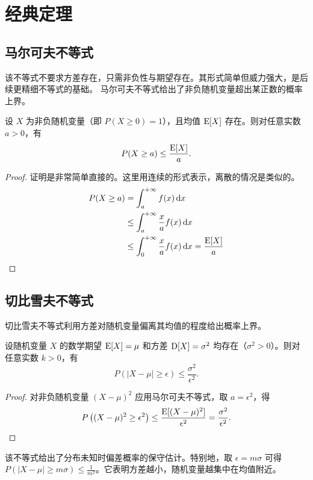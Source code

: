 
\section{经典定理}
\subsection{马尔可夫不等式}

该不等式不要求方差存在，只需非负性与期望存在。其形式简单但威力强大，是后续更精细不等式的基础。
马尔可夫不等式给出了非负随机变量超出某正数的概率上界。

\begin{theorem}[马尔可夫不等式]
设 \(X\) 为非负随机变量（即 \(P(X \ge 0)=1\)），且均值 \(\operatorname{E}[X]\) 存在。则对任意实数 \(a > 0\)，有
\[
P(X \ge a) \le \frac{\operatorname{E}[X]}{a}.
\]
\end{theorem}

\begin{proof}
证明是非常简单直接的。这里用连续的形式表示，离散的情况是类似的。
\begin{align*}
P(X\geq a) &= \int_{a}^{+\infty}f(x)\mathop{}\!\mathrm{d} x\\ 
&\leq \int_{a}^{+\infty}\frac{x}{a}f(x)\mathop{}\!\mathrm{d} x \\
&\leq \int_{0}^{+\infty}\frac{x}{a}f(x)\mathop{}\!\mathrm{d} x = \frac{\operatorname{E}[X]}{a}
\end{align*}
\end{proof}

\subsection{切比雪夫不等式}

切比雪夫不等式利用方差对随机变量偏离其均值的程度给出概率上界。

\begin{theorem}[切比雪夫不等式]
设随机变量 \(X\) 的数学期望 \(\operatorname{E}[X]=\mu\) 和方差 \(\operatorname{D}[X]=\sigma^2\) 均存在（\(\sigma^2>0\)）。则对任意实数 \(k > 0\)，有
\[
P(|X-\mu| \ge \epsilon) \le \frac{\sigma^2}{\epsilon^2}.
\]
\end{theorem}

\begin{proof}
对非负随机变量 \((X-\mu)^2\) 应用马尔可夫不等式，取 \(a=\epsilon^2\)，得
\[
P\left( (X-\mu)^2 \ge \epsilon^2 \right) \le \frac{\operatorname{E}[(X-\mu)^2]}{\epsilon^2} = \frac{\sigma^2}{\epsilon^2}.
\]
\end{proof}

该不等式给出了分布未知时偏差概率的保守估计。特别地，取 \(\epsilon = m\sigma\) 可得 \(P(|X-\mu| \ge m\sigma) \le \frac{1}{m^2}\)。它表明方差越小，随机变量越集中在均值附近。

